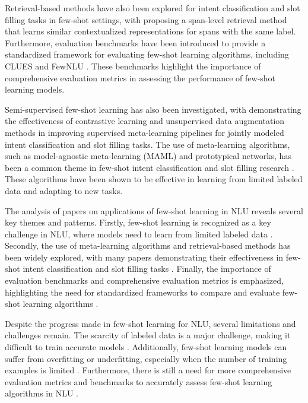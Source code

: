 \documentclass[conference]{IEEEtran}
\begin{document}
Retrieval-based methods have also been explored for intent classification and slot filling tasks in few-shot settings, with \cite{b4} proposing a span-level retrieval method that learns similar contextualized representations for spans with the same label. Furthermore, evaluation benchmarks have been introduced to provide a standardized framework for evaluating few-shot learning algorithms, including CLUES \cite{b5} and FewNLU \cite{b6}. These benchmarks highlight the importance of comprehensive evaluation metrics in assessing the performance of few-shot learning models.

Semi-supervised few-shot learning has also been investigated, with \cite{b7} demonstrating the effectiveness of contrastive learning and unsupervised data augmentation methods in improving supervised meta-learning pipelines for jointly modeled intent classification and slot filling tasks. The use of meta-learning algorithms, such as model-agnostic meta-learning (MAML) and prototypical networks, has been a common theme in few-shot intent classification and slot filling research \cite{b8}. These algorithms have been shown to be effective in learning from limited labeled data and adapting to new tasks.

The analysis of papers on applications of few-shot learning in NLU reveals several key themes and patterns. Firstly, few-shot learning is recognized as a key challenge in NLU, where models need to learn from limited labeled data \cite{b9}. Secondly, the use of meta-learning algorithms and retrieval-based methods has been widely explored, with many papers demonstrating their effectiveness in few-shot intent classification and slot filling tasks \cite{b10}. Finally, the importance of evaluation benchmarks and comprehensive evaluation metrics is emphasized, highlighting the need for standardized frameworks to compare and evaluate few-shot learning algorithms \cite{b11}.

Despite the progress made in few-shot learning for NLU, several limitations and challenges remain. The scarcity of labeled data is a major challenge, making it difficult to train accurate models \cite{b12}. Additionally, few-shot learning models can suffer from overfitting or underfitting, especially when the number of training examples is limited \cite{b13}. Furthermore, there is still a need for more comprehensive evaluation metrics and benchmarks to accurately assess few-shot learning algorithms in NLU \cite{b14}.
\end{document}

